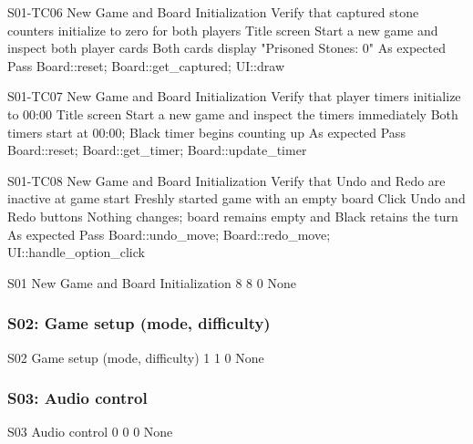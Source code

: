     \begin{test}
        {S01-TC06}
        {New Game and Board Initialization}
        {Verify that captured stone counters initialize to zero for both players}
        {Title screen}
        {Start a new game and inspect both player cards}
        {Both cards display "Prisoned Stones: 0"}
        {As expected}
        {Pass}
        {Board::reset; Board::get\_captured; UI::draw}
    \end{test}
    \begin{test}
        {S01-TC07}
        {New Game and Board Initialization}
        {Verify that player timers initialize to 00:00}
        {Title screen}
        {Start a new game and inspect the timers immediately}
        {Both timers start at 00:00; Black timer begins counting up}
        {As expected}
        {Pass}
        {Board::reset; Board::get\_timer; Board::update\_timer}
    \end{test}
    \begin{test}
        {S01-TC08}
        {New Game and Board Initialization}
        {Verify that Undo and Redo are inactive at game start}
        {Freshly started game with an empty board}
        {Click Undo and Redo buttons}
        {Nothing changes; board remains empty and Black retains the turn}
        {As expected}
        {Pass}
        {Board::undo\_move; Board::redo\_move; UI::handle\_option\_click}
    \end{test}
    \begin{testsummary}
        {S01}
        {New Game and Board Initialization}
        {8}
        {8}
        {0}
        {None}
    \end{testsummary}

\subsubsection{S02: Game setup (mode, difficulty)}
    \begin{testsummary}
        {S02}
        {Game setup (mode, difficulty)}
        {1}
        {1}
        {0}
        {None}
    \end{testsummary}

\subsubsection{S03: Audio control}
    \begin{testsummary}
        {S03}
        {Audio control}
        {0}
        {0}
        {0}
        {None}
    \end{testsummary}

